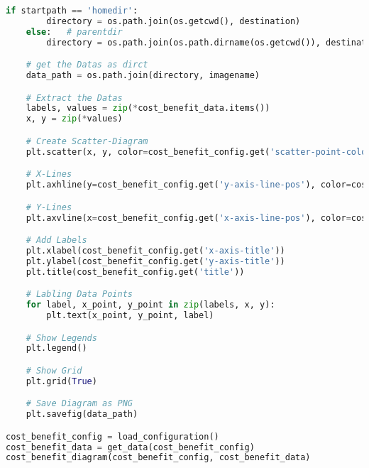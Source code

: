 \begin{lstlisting}[language=python, caption=Python LaTex - cost\_benefit\_diagram.py - Kosten-Nutzen-Diagramm,captionpos=b,label={lst:cost_benefit_diagram},breaklines=true]
    if startpath == 'homedir':
        directory = os.path.join(os.getcwd(), destination)
    else:   # parentdir
        directory = os.path.join(os.path.dirname(os.getcwd()), destination)

    # get the Datas as dirct
    data_path = os.path.join(directory, imagename)

    # Extract the Datas
    labels, values = zip(*cost_benefit_data.items())
    x, y = zip(*values)

    # Create Scatter-Diagram
    plt.scatter(x, y, color=cost_benefit_config.get('scatter-point-color'))

    # X-Lines
    plt.axhline(y=cost_benefit_config.get('y-axis-line-pos'), color=cost_benefit_config.get('y-axis-line-color'), linestyle=cost_benefit_config.get('y-axis-line-type'), label=cost_benefit_config.get('y-axis-line-label'))

    # Y-Lines
    plt.axvline(x=cost_benefit_config.get('x-axis-line-pos'), color=cost_benefit_config.get('x-axis-line-color'), linestyle=cost_benefit_config.get('x-axis-line-type'), label=cost_benefit_config.get('x-axis-line-label'))

    # Add Labels
    plt.xlabel(cost_benefit_config.get('x-axis-title'))
    plt.ylabel(cost_benefit_config.get('y-axis-title'))
    plt.title(cost_benefit_config.get('title'))

    # Labling Data Points
    for label, x_point, y_point in zip(labels, x, y):
        plt.text(x_point, y_point, label)

    # Show Legends
    plt.legend()

    # Show Grid
    plt.grid(True)

    # Save Diagram as PNG
    plt.savefig(data_path)

cost_benefit_config = load_configuration()
cost_benefit_data = get_data(cost_benefit_config)
cost_benefit_diagram(cost_benefit_config, cost_benefit_data)
\end{lstlisting}
